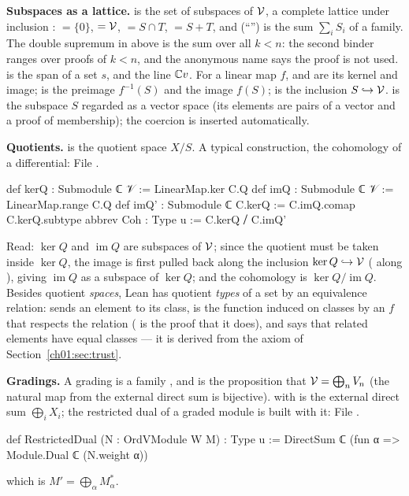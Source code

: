 \textbf{Subspaces as a lattice.}  is the set of subspaces of $\mathcal{V}$, a complete
lattice under inclusion :  $=\{0\}$,  $=\mathcal{V}$,  $=S\cap T$,
 $=S+T$, and  (``'') is the sum $\sum_iS_i$ of a family.
The double supremum  in  above is the sum over all
$k<n$: the second binder ranges over proofs of $k<n$, and the anonymous name \lean{_} says the proof
is not used.  is the span of a set $s$, and  the line ${\mathbb{C}} v$.
For a linear map $f$,  and  are its kernel and image;
 is the preimage $f^{-1}(S)$ and  the image $f(S)$; 
is the inclusion $S\hookrightarrow\mathcal{V}$.  is the subspace $S$ regarded as a vector space
(its elements are pairs of a vector and a proof of membership); the coercion is inserted
automatically.

\textbf{Quotients.}  is the quotient space $X/S$. A typical construction, the cohomology
of a differential:
\noindent File .
\begin{leancode}
def kerQ : Submodule ℂ 𝒱 := LinearMap.ker C.Q
def imQ : Submodule ℂ 𝒱 := LinearMap.range C.Q
def imQ' : Submodule ℂ C.kerQ := C.imQ.comap C.kerQ.subtype
abbrev Coh : Type u := C.kerQ ⧸ C.imQ'
\end{leancode}
Read: $\ker Q$ and $\operatorname{im}Q$ are subspaces of $\mathcal{V}$; since the quotient must be taken
inside $\ker Q$, the image is first pulled back along the inclusion $\ker Q\hookrightarrow\mathcal{V}$
( along ), giving $\operatorname{im}Q$ as a subspace of $\ker Q$; and the
cohomology is $\ker Q/\operatorname{im}Q$.
Besides quotient \emph{spaces}, Lean has quotient \emph{types} of a set by an equivalence relation:
 sends an element to its class,  is the function induced on
classes by an $f$ that respects the relation ( is the proof that it does), and
 says that related elements have equal classes --- it is derived from the axiom
 of Section~\ref{ch01:sec:trust}.

\textbf{Gradings.} A grading is a family , and
 is the proposition that $\mathcal{V} = \bigoplus_nV_n$ (the natural map
from the external direct sum is bijective).  with  is the
external direct sum $\bigoplus_iX_i$; the restricted dual of a graded module is built with it:
\noindent File .
\begin{leancode}
def RestrictedDual (N : OrdVModule W M) : Type u := DirectSum ℂ (fun α => Module.Dual ℂ (N.weight α))
\end{leancode}
which is $M' = \bigoplus_\alpha M_\alpha^*$.

